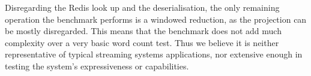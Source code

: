 Disregarding the Redis look up and the deserialisation, the only remaining operation the benchmark performs is a windowed reduction, as the projection can be mostly disregarded. This means that the benchmark does not add much complexity over a very basic word count test. Thus we believe it is neither representative of typical streaming systems applications, nor extensive enough in testing the system's expressiveness or capabilities.

